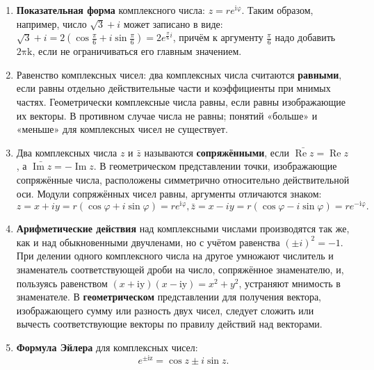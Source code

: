 \begin{enumerate}
\item
    \textbf{Показательная форма} комплексного числа:
    $z = re^{\text{iφ}}$.
    Таким образом, например, число $\sqrt{3} + i$ может записано в виде:
    $\sqrt{3} + i = 2(\cos\frac{\pi}{6} + i\sin\frac{\pi}{6}) = 2e^{\frac{\pi}{6}i}$,
    причём к аргументу $\frac{\pi}{6}$ надо добавить $2\text{πk}$, если не ограничиваться его главным значением.

\item
    Равенство комплексных чисел: два комплексных числа считаются
    \textbf{равными}, если равны отдельно действительные части и
    коэффициенты при мнимых частях. Геометрически комплексные числа равны,
    если равны изображающие их векторы. В противном случае числа не равны;
    понятий «больше» и «меньше» для комплексных чисел не существует.

\item 
    Два комплексных числа $z$ и $\bar{z}$ называются
    \textbf{сопряжёнными}, если
    $\bar{\operatorname{Re}z} = \operatorname{Re}z$, а
    $\bar{\operatorname{Im}z} = - \operatorname{Im}z$. В геометрическом
    представлении точки, изображающие сопряжённые числа, расположены
    симметрично относительно действительной оси. Модули сопряжённых чисел
    равны, аргументы отличаются знаком:
    \begin{equation*}
        z = x + iy = r(\cos\varphi + i\sin\varphi) = re^{\text{iφ}},
        \bar{z} = x - iy = r(\cos\varphi - i\sin\varphi) = re^{- \text{iφ}}.
    \end{equation*}

\item
  \textbf{Арифметические действия} над комплексными числами производятся
  так же, как и над обыкновенными двучленами, но с учётом равенства
  $( \pm i)^{2} = - 1$. При делении одного комплексного числа на
  другое умножают числитель и знаменатель соответствующей дроби на
  число, сопряжённое знаменателю, и, пользуясь равенством
  $(x + \text{iy})(x - \text{iy}) = x^{2} + y^{2}$, устраняют мнимость
  в знаменателе. В \textbf{геометрическом} представлении для получения
  вектора, изображающего сумму или разность двух чисел, следует сложить
  или вычесть соответствующие векторы по правилу действий над векторами.
\item
    \textbf{Формула Эйлера} для комплексных чисел:
    \begin{equation*}
        e^{\pm \text{iz}} = \cos z \pm i\sin z.
    \end{equation*}


\end{enumerate}
